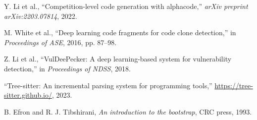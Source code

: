 \documentclass[conference]{IEEEtran}
\begin{document}
\begin{thebibliography}{99}
Y. Li et al., ``Competition-level code generation with alphacode,'' \emph{arXiv preprint arXiv:2203.07814}, 2022.

M. White et al., ``Deep learning code fragments for code clone detection,'' in \emph{Proceedings of ASE}, 2016, pp. 87--98.

Z. Li et al., ``VulDeePecker: A deep learning-based system for vulnerability detection,'' in \emph{Proceedings of NDSS}, 2018.

``Tree-sitter: An incremental parsing system for programming tools,'' \url{https://tree-sitter.github.io/}, 2023.

B. Efron and R. J. Tibshirani, \emph{An introduction to the bootstrap}, CRC press, 1993.

\end{thebibliography}
\end{document}
